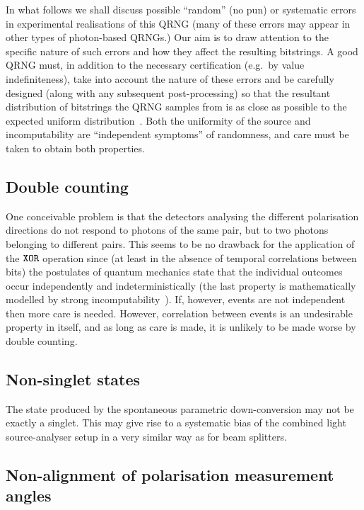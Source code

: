 \documentclass{mscs}
\begin{document}
In what follows we shall discuss possible ``random'' (no pun) or systematic errors in experimental realisations of this QRNG (many of these errors may appear in other types of photon-based QRNGs.)  Our aim is to draw attention to the specific nature of such errors and how they affect the resulting bitstrings. A good QRNG must, in addition to the necessary certification (e.g.\ by value indefiniteness), take into account the nature of these errors and be carefully designed (along with any subsequent post-processing) so that the resultant distribution of bitstrings the QRNG samples from is as close as possible to the expected uniform distribution~\citep{AbbottCalude10}. Both the uniformity of the source and incomputability are ``independent symptoms'' of randomness, and care must be taken to obtain both properties.

\subsection{Double counting}

One conceivable problem is that
the detectors analysing the different polarisation directions do not respond to photons of the same pair,
but to two photons belonging to different pairs.
This seems to be no drawback for the application of the ${\tt XOR}$ operation since
(at least in the absence of temporal correlations between bits)
the postulates of quantum mechanics state that
the individual outcomes occur independently and indeterministically (the last property is mathematically  modelled by strong incomputability~\citep{2008-cal-svo,Abbott:aa}).
If, however, events are not independent then more care is needed. However, correlation between events is an undesirable property in itself, and as long as care is made, it is unlikely to be made worse by double counting.


\subsection{Non-singlet states}

The state produced by the  spontaneous parametric down-conversion may not be exactly a singlet.
This may give rise to a systematic bias of the combined light source-analyser setup in a very similar way as for beam splitters.

\subsection{Non-alignment of polarisation measurement angles}\label{sec:nonalignment}
\end{document}
